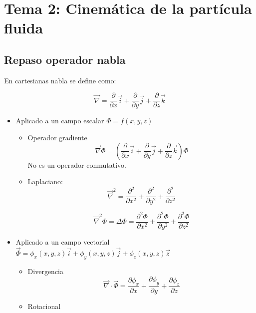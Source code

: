 \section{Tema 2: Cinemática de la partícula fluida}

\subsection{Repaso operador nabla}
En cartesianas nabla se define como:

\[\vec\nabla=\frac{\partial}{\partial x}\vec i + \frac{\partial}{\partial y}\vec j +\frac{\partial}{\partial z}\vec k\]

\begin{itemize}
	\item Aplicado a un campo escalar $\Phi = f(x,y,z)$
	
	\begin{itemize}
		\item Operador gradiente
		\[\vec\nabla \Phi = \left(\frac{\partial}{\partial x}\vec i + \frac{\partial}{\partial y}\vec j +\frac{\partial}{\partial z}\vec k\right) \Phi\]
No es un operador conmutativo.
\item Laplaciano: 
\[\vec\nabla^2=\frac{\partial^2}{\partial x^2}+\frac{\partial^2}{\partial y^2}+\frac{\partial^2}{\partial z^2}\]

\[\vec\nabla^2\Phi=\Delta\Phi=\frac{\partial^2\Phi}{\partial x^2}+\frac{\partial^2\Phi}{\partial y^2}+\frac{\partial^2\Phi}{\partial z^2}\]
	\end{itemize}
	
	\item Aplicado a un campo vectorial $\vec\Phi = \phi_x(x,y,z)\vec i+\phi_y(x,y,z)\vec j+\phi_z(x,y,z)\vec z$
	\begin{itemize}
		\item Divergencia
		\[\vec\nabla \cdot \vec\Phi = \frac{\partial \phi_x}{\partial x} + \frac{\partial \phi_y}{\partial y} + \frac{\partial \phi_z}{\partial z}\]
		
		\item Rotacional
		

\end{itemize}
\end{itemize}
